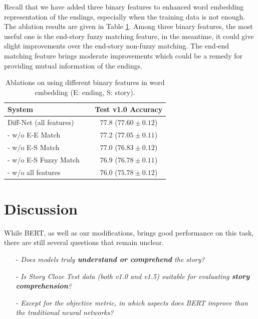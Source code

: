 \documentclass[letterpaper]{article} %
\begin{document}
Recall that we have added three binary features to enhanced word embedding representation of the endings, especially when the training data is not enough. 
The ablation results are given in Table \ref{ablation-feature}.
Among three binary features, the most useful one is the end-story fuzzy matching feature, in the meantime, it could give slight improvements over the end-story non-fuzzy matching. The end-end matching feature brings moderate improvements which could be a remedy for providing mutual information of the endings.

        \begin{table}[tp]
        \begin{center}
        \begin{tabular}{lc}
        \toprule
        {\bf System} & {\bf Test v1.0 Accuracy} \\
        \midrule
	Diff-Net (all features)~~~~					& 77.8 \small($77.60 \pm 0.12$) \\
	- w/o E-E Match 						& 77.2 \small($77.05 \pm 0.11$) \\
	- w/o E-S Match 						& 77.0 \small($76.83 \pm 0.12$) \\
	- w/o E-S Fuzzy Match 					& 76.9 \small($76.78 \pm 0.11$) \\
	- w/o all features 						& 76.0 \small($75.78 \pm 0.12$) \\
        \bottomrule
        \end{tabular}
        \end{center}
        \caption{\label{ablation-feature} Ablations on using different binary features in word embedding (E: ending, S: story).}
        \end{table}    


\section{Discussion}
While BERT, as well as our modifications, brings good performance on this task, there are still several questions that remain unclear.
\begin{itemize}[leftmargin=*]
	\item[-] {\em Does models truly {\bf\em{understand or comprehend}} the story?}
	\item[-] {\em Is Story Cloze Test data (both v1.0 and v1.5) suitable for evaluating {\bf\em{story comprehension}}?}
	\item[-] {\em Except for the objective metric, in which aspects does BERT improve than the traditional neural networks?}
\end{itemize}
\end{document}
